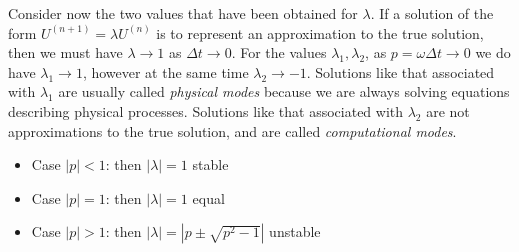 Consider now the two values that have been obtained for $\lambda$. If a solution of the form $U^{(n+1)}=\lambda U^{(n)}$ is to represent an approximation to the true solution, then we must have $\lambda\rightarrow 1$ as $\Delta t\rightarrow0$. For the values $\lambda_1, \lambda_2$, as $p=\omega\Delta t\rightarrow0$ we do have $\lambda_1\rightarrow1$, however at the same time $\lambda_2\rightarrow-1$. Solutions like that associated with $\lambda_1$ are usually called \textit{physical modes} because we are always solving equations describing physical processes. Solutions like that associated with $\lambda_2$ are not approximations to the true solution, and are called \textit{computational modes}.
\begin{itemize}
    \item Case $|p|<1$: then $|\lambda|=1$ stable
    \item Case $|p|=1$: then $|\lambda|=1$ equal
    \item Case $|p|>1$: then $|\lambda|=|p\pm\sqrt{p^2-1}|$ unstable
\end{itemize}
